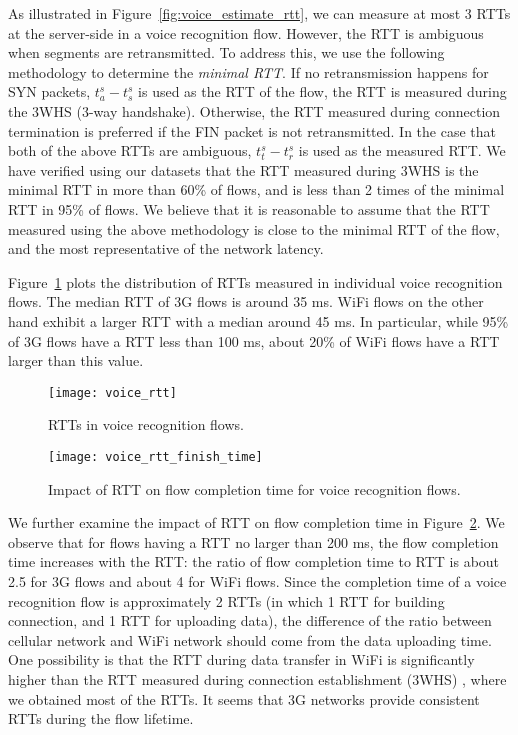 As illustrated in Figure~\ref{fig:voice_estimate_rtt}, we can measure at most 3 RTTs at the server-side in a voice recognition flow. However, the RTT is ambiguous when segments are retransmitted. To address this, we use the following methodology to determine the \emph{minimal RTT}. If no retransmission happens for SYN packets, $t^s_a - t^s_s$ is used as the RTT of the flow, \ie the RTT is measured during the 3WHS (3-way handshake). Otherwise, the RTT measured during connection termination is preferred if the FIN packet is not retransmitted. In the case that both of the above RTTs are ambiguous, $t^s_t - t^s_r$ is used as the measured RTT. We have verified using our datasets that the RTT measured during 3WHS is the minimal RTT in more than 60\% of flows, and is less than 2 times of the minimal RTT in 95\% of flows. We believe that it is reasonable to assume that the RTT measured using the above methodology is close to the minimal RTT of the flow, and the most representative of the network latency.

Figure~\ref{fig:voice_rtt} plots the distribution of RTTs measured in individual voice recognition flows. The median RTT of 3G flows is around 35 ms. WiFi flows on the other hand exhibit a larger RTT with a median around 45 ms. In particular, while 95\% of 3G flows have a RTT less than 100 ms, about 20\% of WiFi flows have a RTT larger than this value.

\begin{figure}[t]
\centering
	\texttt{[image: voice\_rtt]}
\caption{RTTs in voice recognition flows.}
\label{fig:voice_rtt}
\end{figure}

\begin{figure}[th]
\centering
	\texttt{[image: voice\_rtt\_finish\_time]}
\caption{Impact of RTT on flow completion time for voice recognition flows.}
\label{fig:v_rtt_time}
\end{figure}

We further examine the impact of RTT on flow completion time in Figure~\ref{fig:v_rtt_time}. We observe that for flows having a RTT no larger than 200 ms, the flow completion time increases with the RTT: the ratio of flow completion time to RTT is about 2.5 for 3G flows and about 4 for WiFi flows. Since the completion time of a voice recognition flow is approximately 2 RTTs (in which 1 RTT for building connection, and 1 RTT for uploading data), the difference of the ratio between cellular network and WiFi network should come from the data uploading time. One possibility is that the RTT during data transfer in WiFi is significantly higher than the RTT measured during connection establishment (\ie 3WHS) \cite{UM-CS-2012-022}, where we obtained most of the RTTs. It seems that 3G networks provide consistent RTTs during the flow lifetime.

